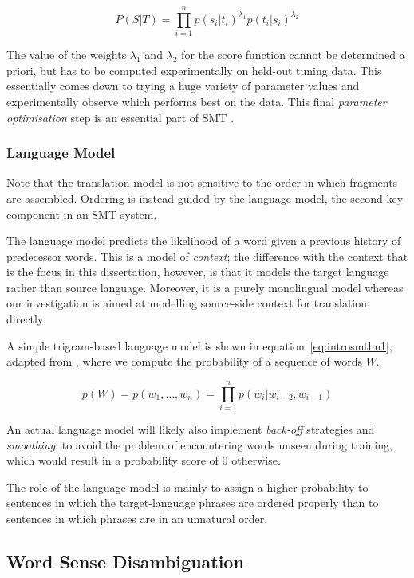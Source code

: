 \begin{equation}
P(S|T) = \prod_{i=1}^{n} p(s_i|t_i)^{\lambda_1} p(t_i|s_i)^{\lambda_2}
\label{eq:introsmt3}
\end{equation}

The value of the weights $\lambda_1$ and $\lambda_2$ for the score function cannot be determined a priori,
but has to be computed experimentally on held-out tuning data. This essentially
comes down to trying a huge variety of parameter values and experimentally
observe which performs best on the data.  This final \emph{parameter
optimisation} step is an essential part of SMT \citep{MERT}.

\subsubsection{Language Model}

Note that the translation model is not sensitive to the order in which
fragments are assembled. Ordering is instead guided by the language model,
the second key component in an SMT system.

The language model predicts the likelihood of a word given a previous history
of predecessor words. This is a model of \emph{context}; the difference with
the context that is the focus in this dissertation, however, is that it models
the target language rather than source language. Moreover, it is a purely
monolingual model whereas our investigation is aimed at modelling source-side
context for translation directly.

A simple trigram-based language model is shown in equation~\ref{eq:introsmtlm1}, adapted from
\cite{Cole1997}, where we compute the probability of a sequence of words $W$.

\begin{equation}
p(W) = p(w_1,\ldots,w_n) = \prod_{i=1}^{n} p(w_i|w_{i-2},w_{i-1})
\label{eq:introsmtlm1}
\end{equation}

An actual language model will likely also implement \emph{back-off} strategies and
\emph{smoothing}, to avoid the problem of encountering words unseen during
training, which would result in a probability score of $0$ otherwise.

The role of the language model is mainly to assign a higher probability to
sentences in which the target-language phrases are ordered properly than
to sentences in which phrases are in an unnatural order.

\subsection{Word Sense Disambiguation}

